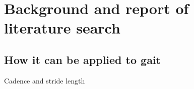 \section{Background and report of literature search}

\subsection{How it can be applied to gait}

Cadence and stride length \cite{GaitBook}
